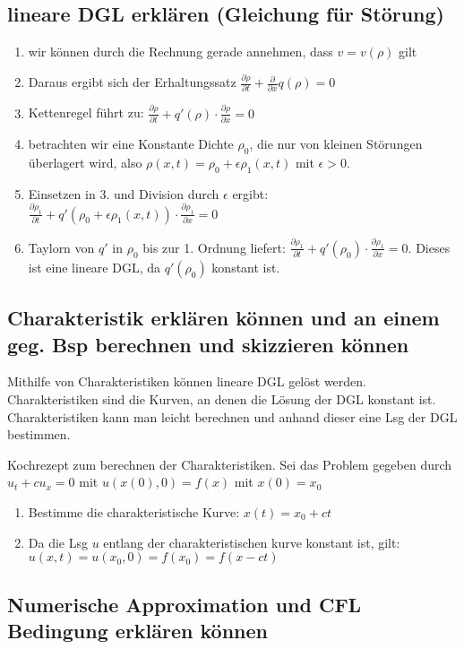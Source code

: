\documentclass[]{article}
\begin{document}
\subsection*{lineare DGL erklären (Gleichung für Störung)}
\begin{enumerate}
	\item wir können durch die Rechnung gerade annehmen, dass $v=v(\rho)$ gilt
	\item Daraus ergibt sich der Erhaltungssatz $ \frac{\partial \rho}{\partial t} + \frac{\partial}{\partial x} q( \rho ) = 0 $
	\item Kettenregel führt zu: $\frac{\partial \rho}{\partial t} + q'(\rho) \cdot \frac{\partial \rho}{\partial x} = 0$
	\item betrachten wir eine Konstante Dichte $\rho_0$, die nur von kleinen Störungen überlagert wird, also $\rho(x,t) = \rho_0 + \epsilon \rho_1(x,t)$ mit $ \epsilon > 0$. 
	\item Einsetzen in 3. und Division durch $\epsilon$ ergibt: $\frac{\partial \rho_1}{\partial t} + q' \left( \rho_0 + \epsilon \rho_1(x,t) \right) \cdot \frac{\partial \rho_1}{\partial x} = 0$
	\item Taylorn von $q'$ in $\rho_0$ bis zur 1. Ordnung liefert: $\frac{\partial \rho_1}{\partial t} + q'(\rho_0) \cdot \frac{\partial \rho_1}{\partial x} = 0$. Dieses ist eine lineare DGL, da $q'(\rho_0)$ konstant ist. 
\end{enumerate}

\subsection*{Charakteristik erklären können und an einem geg. Bsp berechnen und skizzieren können}
Mithilfe von Charakteristiken können lineare DGL gelöst werden. Charakteristiken sind die Kurven, an denen die Lösung der DGL konstant ist. Charakteristiken kann man leicht berechnen und anhand dieser eine Lsg der DGL bestimmen. 

Kochrezept zum berechnen der Charakteristiken. Sei das Problem gegeben durch $u_t + c u_x = 0$ mit $u(x(0),0)= f(x)$ mit $x(0)=x_0$
\begin{enumerate}
	\item Bestimme die charakteristische Kurve: $x(t)=x_0 + ct$
	\item Da die Lsg $u$ entlang der charakteristischen kurve konstant ist, gilt: $u(x,t)=u(x_0,0)=f(x_0)=f(x-ct)$
\end{enumerate}

\subsection*{Numerische Approximation und CFL Bedingung erklären können}
\end{document}
